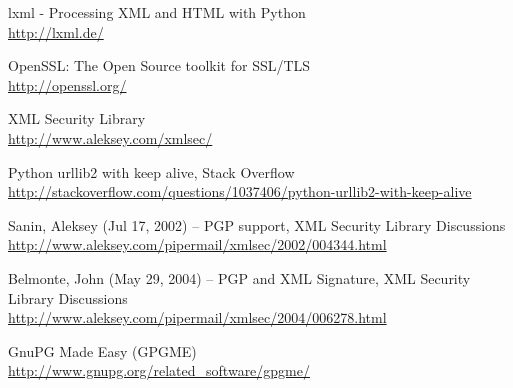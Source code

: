\begin{thebibliography}{99}
lxml - Processing XML and HTML with Python\\
\url{http://lxml.de/}

OpenSSL: The Open Source toolkit for SSL/TLS\\
\url{http://openssl.org/}

XML Security Library\\
\url{http://www.aleksey.com/xmlsec/}

Python urllib2 with keep alive, Stack Overflow\\
\url{http://stackoverflow.com/questions/1037406/python-urllib2-with-keep-alive}

Sanin, Aleksey (Jul 17, 2002) -- PGP support, XML Security Library Discussions\\
\url{http://www.aleksey.com/pipermail/xmlsec/2002/004344.html}

Belmonte, John (May 29, 2004) -- PGP and XML Signature, XML Security Library Discussions\\
\url{http://www.aleksey.com/pipermail/xmlsec/2004/006278.html}

GnuPG Made Easy (GPGME)\\
\url{http://www.gnupg.org/related_software/gpgme/}

\end{thebibliography}

